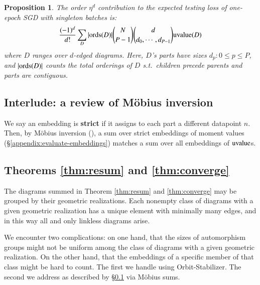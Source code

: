 \documentclass[anon,12pt]{colt2021} %
\newtheorem{prop}{Proposition}
\newcommand{\uvalue}{\text{\textnormal{uvalue}}}
\newcommand{\ords}{\text{\textnormal{ords}}}
\begin{document}
        \begin{prop} \label{prop:vanilla}
            The order $\eta^d$ contribution to the expected testing loss of
            one-epoch SGD with singleton batches is:
            \begin{equation*}\label{eq:sgdbasiccoef}
                \frac{(-1)^d}{d!} \sum_{D} 
                |\ords(D)| {N \choose P-1} {d \choose d_0,\cdots,d_{P-1}}
                \uvalue(D)
            \end{equation*}
            where $D$ ranges over $d$-edged diagrams.  Here, $D$'s parts have
            sizes $d_p: 0\leq p\leq P$, and $|\ords(D)|$ counts the total
            orderings of $D$ s.t.\ children precede parents and parts are
            contiguous.
        \end{prop}

    \subsection{Interlude: a review of M\"obius inversion}          \label{appendix:mobius}

        We say an embedding is \textbf{strict} if it assigns to each part
        a different datapoint $n$.
        Then, by M\"obius inversion (\cite{ro64}), a sum over strict embeddings
        of moment values (\S\ref{appendix:evaluate-embeddings}) matches 
        a sum over all embeddings of $\uvalue$s.

    \subsection{Theorems \ref{thm:resum} and \ref{thm:converge}}    \label{appendix:resum}

        The diagrams summed in Theorem \ref{thm:resum} and \ref{thm:converge}
        may be grouped by their geometric realizations.  Each nonempty class of
        diagrams with a given geometric realization has a unique element with
        minimally many edges, and in this way all and only linkless diagrams
        arise. 

        We encounter two complications: on one hand, that the sizes of
        automorphism groups might not be uniform among the class of diagrams
        with a given geometric realization.  On the other hand, that the
        embeddings of a specific member of that class might be hard to count.
        The first we handle using Orbit-Stabilizer.  The second we address as
        described by \S\ref{appendix:mobius} via M\"obius sums.
           
\end{document}
